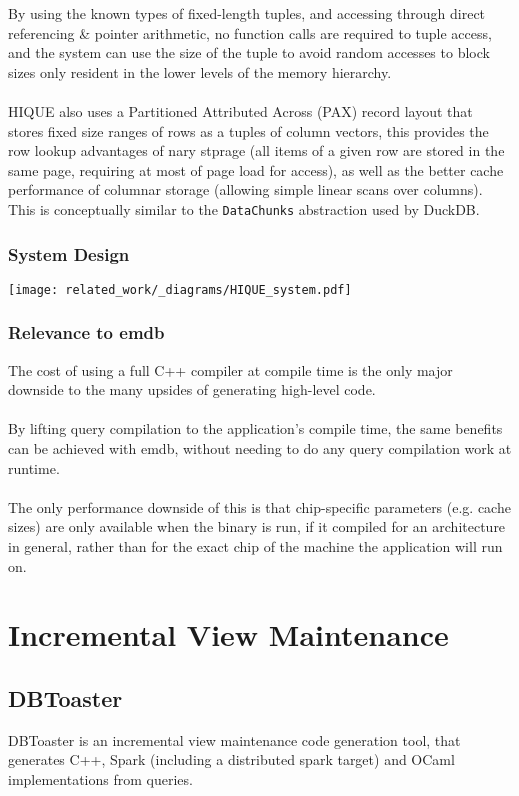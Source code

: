 By using the known types of fixed-length tuples, and accessing through direct referencing \& pointer arithmetic, no function calls are required to tuple access, and the system can use the size of the tuple to avoid random accesses to block sizes only resident in the lower levels of the memory hierarchy.
\\
\\ HIQUE also uses a Partitioned Attributed Across (PAX) record layout\cite{PAXStorageModel} that stores fixed size ranges of rows as a tuples of column vectors, this provides the row lookup advantages of nary stprage (all items of a given row are stored in the same page, requiring at most of page load for access), as well as the better cache performance of columnar storage (allowing simple linear scans over columns). This is conceptually similar to the \texttt{DataChunks} abstraction used by DuckDB.
\subsubsection{System Design}
\begin{center}
    \texttt{[image: related\_work/\_diagrams/HIQUE\_system.pdf]}
\end{center}
\subsubsection{Relevance to emdb}
The cost of using a full C++ compiler at compile time is the only major downside to the many upsides of generating high-level code.
\\
\\ By lifting query compilation to the application's compile time, the same benefits can be achieved with emdb, without needing to do any query compilation work at runtime.
\\
\\ The only performance downside of this is that chip-specific parameters (e.g. cache sizes) are only available when the binary is run, if it compiled for an architecture in general, rather than for the exact chip of the machine the application will run on.

\section{Incremental View Maintenance}
\subsection{DBToaster}
\label{sec:db_toaster}
DBToaster is an incremental view maintenance code generation tool, that generates C++, Spark (including a distributed spark target) and OCaml implementations from queries.
